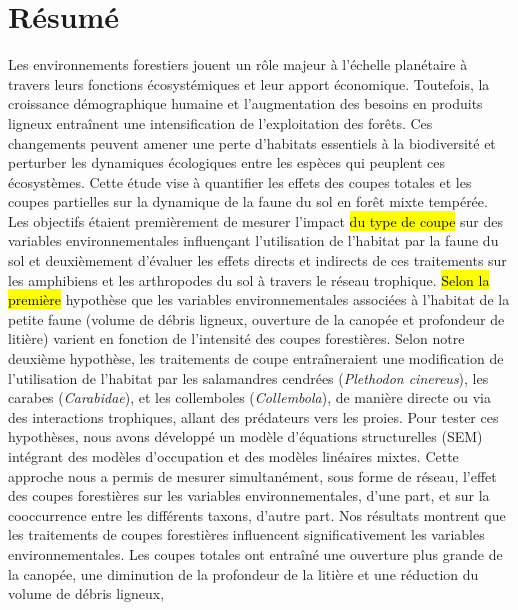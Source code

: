 \chapter*{Résumé}               %
\label{chap-resume}             %

Les environnements forestiers jouent un rôle majeur à l’échelle planétaire à travers leurs fonctions écosystémiques et leur apport économique. 
Toutefois, la croissance démographique humaine et l’augmentation des besoins en produits ligneux entraînent une intensification de l'exploitation des forêts. 
Ces changements peuvent amener une perte d'habitats essentiels à la biodiversité et perturber les dynamiques écologiques entre les espèces qui peuplent ces écosystèmes. 
Cette étude vise à quantifier les effets des coupes totales et les coupes partielles sur la dynamique de la faune du sol en forêt mixte tempérée. 
Les objectifs étaient premièrement de mesurer l’impact \hl{du type de coupe} sur des variables environnementales influençant l’utilisation de l’habitat par la faune du sol 
et deuxièmement d’évaluer les effets directs et indirects de ces traitements sur les amphibiens et les arthropodes du sol à travers le réseau trophique. 
\hl{Selon la première} hypothèse que les variables environnementales associées à l’habitat de la petite faune (volume de débris ligneux, ouverture de la canopée et profondeur de litière) varient en fonction de l’intensité des coupes forestières. 
Selon notre deuxième hypothèse, les traitements de coupe entraîneraient une modification de l'utilisation de l'habitat 
par les salamandres cendrées (\textit{Plethodon cinereus}), les carabes (\textit{Carabidae}), et les collemboles (\textit{Collembola}), de manière directe ou via des interactions trophiques, 
allant des prédateurs vers les proies. 
Pour tester ces hypothèses, nous avons développé un modèle d’équations structurelles (SEM) intégrant des modèles d’occupation et des modèles linéaires mixtes. 
Cette approche nous a permis de mesurer simultanément, sous forme de réseau, l’effet des coupes forestières sur les variables environnementales, d’une part, et sur la cooccurrence entre les différents taxons, d’autre part. 
Nos résultats montrent que les traitements de coupes forestières influencent significativement les variables environnementales. 
Les coupes totales ont entraîné une ouverture plus grande de la canopée, une diminution de la profondeur de la litière et une réduction du volume de débris ligneux, 
